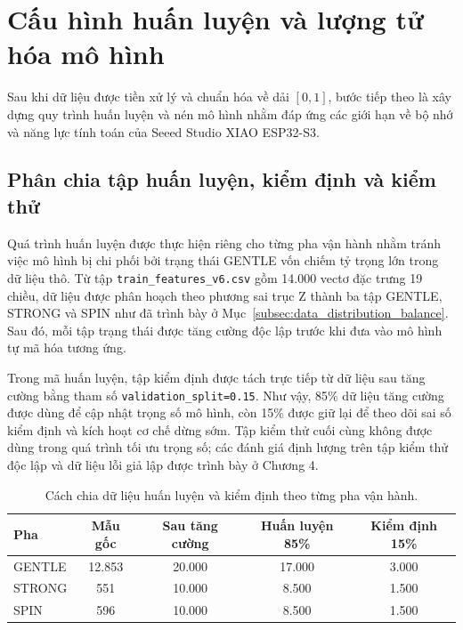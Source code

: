 ﻿%
%



\section{Cấu hình huấn luyện và lượng tử hóa mô hình}

Sau khi dữ liệu được tiền xử lý và chuẩn hóa về dải $[0, 1]$, bước tiếp theo là xây dựng quy trình huấn luyện và nén mô hình nhằm đáp ứng các giới hạn về bộ nhớ và năng lực tính toán của Seeed Studio XIAO ESP32-S3.

\subsection{Phân chia tập huấn luyện, kiểm định và kiểm thử}

Quá trình huấn luyện được thực hiện riêng cho từng pha vận hành nhằm tránh việc mô hình bị chi phối bởi trạng thái GENTLE vốn chiếm tỷ trọng lớn trong dữ liệu thô. Từ tập \texttt{train\_features\_v6.csv} gồm 14.000 vectơ đặc trưng 19 chiều, dữ liệu được phân hoạch theo phương sai trục Z thành ba tập GENTLE, STRONG và SPIN như đã trình bày ở Mục~\ref{subsec:data_distribution_balance}. Sau đó, mỗi tập trạng thái được tăng cường độc lập trước khi đưa vào mô hình tự mã hóa tương ứng.

Trong mã huấn luyện, tập kiểm định được tách trực tiếp từ dữ liệu sau tăng cường bằng tham số \texttt{validation\_split=0.15}. Như vậy, 85\% dữ liệu tăng cường được dùng để cập nhật trọng số mô hình, còn 15\% được giữ lại để theo dõi sai số kiểm định và kích hoạt cơ chế dừng sớm. Tập kiểm thử cuối cùng không được dùng trong quá trình tối ưu trọng số; các đánh giá định lượng trên tập kiểm thử độc lập và dữ liệu lỗi giả lập được trình bày ở Chương 4.

\begin{table}[H]
    \centering
    \caption{Cách chia dữ liệu huấn luyện và kiểm định theo từng pha vận hành.}
    \label{tab:train_val_split}
    \begin{tabular}{lcccc}
        \hline
        \textbf{Pha} & \textbf{Mẫu gốc} & \textbf{Sau tăng cường} & \textbf{Huấn luyện 85\%} & \textbf{Kiểm định 15\%} \\
        \hline
        GENTLE & 12.853 & 20.000 & 17.000 & 3.000 \\
        STRONG & 551 & 10.000 & 8.500 & 1.500 \\
        SPIN & 596 & 10.000 & 8.500 & 1.500 \\
        \hline
    \end{tabular}
\end{table}

